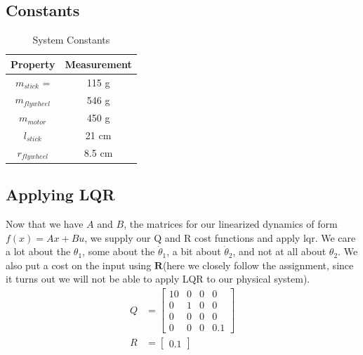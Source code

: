 \documentclass[conference]{IEEEtran}
\begin{document}
\subsection{Constants}
\begin{table}[!h]
    \renewcommand{\arraystretch}{1.5}
    \caption{System Constants}
    \label{tbl:systemparameters}
    \centering
    \begin{tabular}{|c|c|}
        \hline
        Property & Measurement \\
        \hline
        $m_{stick}$ = & 115 g \\
        $m_{flywheel}$ & 546 g\\
        $m_{motor}$ & 450 g \\ %
        $l_{stick} $ & 21 cm \\
        $r_{flywheel}$ & 8.5 cm \\ %
        \hline
    \end{tabular}
    \label{tbl:constants}
\end{table}

\subsection{Applying LQR}

Now that we have $A$ and $B$, the matrices for our linearized dynamics of form
$f(x) = Ax + Bu$, we supply our Q and R cost functions and apply lqr. We care a
lot about the $\theta_1$, some about the $\dot\theta_1$, a bit about
$\dot\theta_2$, and not at all about $\theta_2$.  We also put a cost on the
input using $\textbf{R}$(here we closely follow the
assignment, since it turns out we will not be able to apply LQR to our physical
system).
\begin{align}
    Q &=
    \begin{bmatrix}
        10 & 0 & 0 & 0 \\
        0 & 1 & 0 & 0 \\
        0 & 0 & 0 & 0 \\
        0 & 0 & 0 & 0.1
    \end{bmatrix}\\
    R &= \begin{bmatrix} 0.1 \end{bmatrix}
\end{align}
\end{document}
